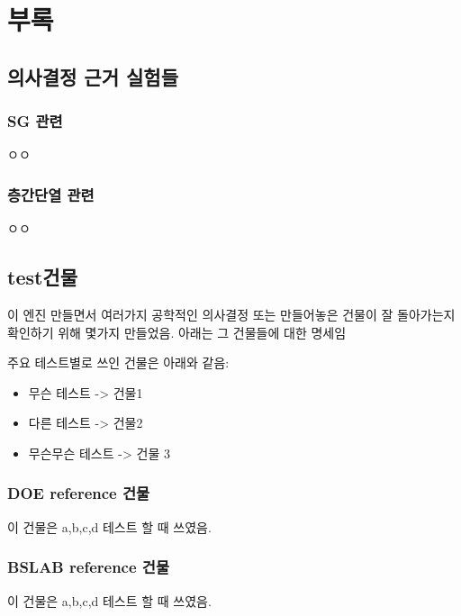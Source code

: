 \part{부록}
\appendix
\renewcommand{\chapterlabel}{Appendix~\thechapter}

\chapter{의사결정 근거 실험들}

\section{SG 관련}
ㅇㅇ

\section{층간단열 관련}
ㅇㅇ

\chapter{test건물}
이 엔진 만들면서 여러가지 공학적인 의사결정 또는 만들어놓은 건물이 잘 돌아가는지 확인하기 위해 몇가지 만들었음.
아래는 그 건물들에 대한 명세임\par

주요 테스트별로 쓰인 건물은 아래와 같음:
\begin{itemize}
  \item 무슨 테스트 -> 건물1
  \item 다른 테스트 -> 건물2
  \item 무슨무슨 테스트 -> 건물 3
\end{itemize}

\section{DOE reference 건물}
이 건물은 a,b,c,d 테스트 할 때 쓰였음.


\section{BSLAB reference 건물}
이 건물은 a,b,c,d 테스트 할 때 쓰였음.